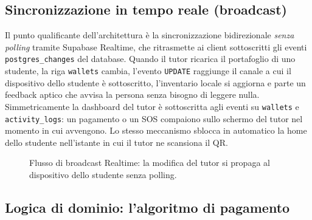 \documentclass[11pt,a4paper]{article}
\begin{document}
\subsection{Sincronizzazione in tempo reale (broadcast)}

Il punto qualificante dell'architettura \`e la sincronizzazione bidirezionale \emph{senza polling}
tramite Supabase Realtime, che ritrasmette ai client sottoscritti gli eventi
\texttt{postgres\_changes} del database. Quando il tutor ricarica il portafoglio di uno studente,
la riga \texttt{wallets} cambia, l'evento \texttt{UPDATE} raggiunge il canale a cui il dispositivo
dello studente \`e sottoscritto, l'inventario locale si aggiorna e parte un feedback aptico che
avvisa la persona senza bisogno di leggere nulla. Simmetricamente la dashboard del tutor \`e
sottoscritta agli eventi su \texttt{wallets} e \texttt{activity\_logs}: un pagamento o un SOS
compaiono sullo schermo del tutor nel momento in cui avvengono. Lo stesso meccanismo sblocca in
automatico la home dello studente nell'istante in cui il tutor ne scansiona il QR.

\begin{figure}[H]
\centering
{}
\caption{Flusso di broadcast Realtime: la modifica del tutor si propaga al dispositivo dello
studente senza polling.}
\end{figure}


\subsection{Logica di dominio: l'algoritmo di pagamento}
\end{document}

